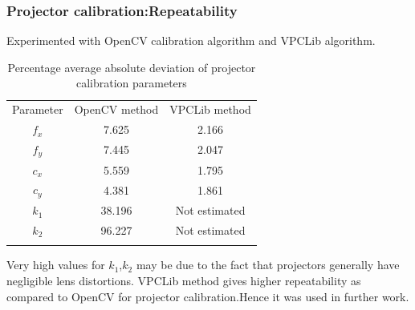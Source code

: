 \documentclass[9pt]{beamer}
\begin{document}
\begin{frame}
\frametitle{Projector calibration:Repeatability}
Experimented with OpenCV calibration algorithm and VPCLib algorithm.
\begin{table}[ht]
\centering
\begin{tabular}{c c c}
\hline\noalign{\smallskip}
Parameter  & OpenCV method & VPCLib method \\
\noalign{\smallskip}\hline\noalign{\smallskip}
$f_x$ & 7.625 & 2.166\\
$f_y$ & 7.445 & 2.047\\
$c_x$ & 5.559 & 1.795\\
$c_y$ & 4.381 & 1.861\\
$k_1$ & 38.196 & Not estimated\\
$k_2$ & 96.227 & Not estimated\\
\noalign{\smallskip}\hline
\end{tabular}
\caption{Percentage average absolute deviation of projector calibration parameters}
\end{table}
Very high values for $k_1$,$k_2$ may be due to the fact that projectors generally have negligible lens distortions.\newline
VPCLib method gives higher repeatability as compared to OpenCV for projector calibration.Hence it was used in further work.
\end{frame}
\end{document}
